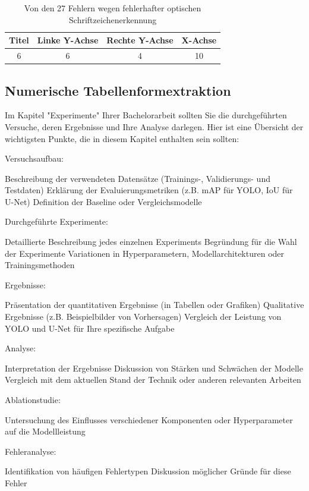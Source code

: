\begin{table}[H]
    \centering
    \begin{tabular}{|c|c|c|c|}
        \hline
        \rowcolor[HTML]{EFEFEF}
        Titel & Linke Y-Achse & Rechte Y-Achse & X-Achse \\ \hline
        6     & 6             & 4              & 10      \\ \hline
    \end{tabular}
    \caption{Von den 27 Fehlern wegen fehlerhafter optischen Schriftzeichenerkennung}
\end{table}


\subsection{Numerische Tabellenformextraktion}



Im Kapitel "Experimente" Ihrer Bachelorarbeit sollten Sie die durchgeführten Versuche, deren Ergebnisse und Ihre Analyse darlegen. Hier ist eine Übersicht der wichtigsten Punkte, die in diesem Kapitel enthalten sein sollten:

Versuchsaufbau:

Beschreibung der verwendeten Datensätze (Trainings-, Validierungs- und Testdaten)
Erklärung der Evaluierungsmetriken (z.B. mAP für YOLO, IoU für U-Net)
Definition der Baseline oder Vergleichsmodelle


Durchgeführte Experimente:

Detaillierte Beschreibung jedes einzelnen Experiments
Begründung für die Wahl der Experimente
Variationen in Hyperparametern, Modellarchitekturen oder Trainingsmethoden


Ergebnisse:

Präsentation der quantitativen Ergebnisse (in Tabellen oder Grafiken)
Qualitative Ergebnisse (z.B. Beispielbilder von Vorhersagen)
Vergleich der Leistung von YOLO und U-Net für Ihre spezifische Aufgabe


Analyse:

Interpretation der Ergebnisse
Diskussion von Stärken und Schwächen der Modelle
Vergleich mit dem aktuellen Stand der Technik oder anderen relevanten Arbeiten


Ablationstudie:

Untersuchung des Einflusses verschiedener Komponenten oder Hyperparameter auf die Modellleistung


Fehleranalyse:

Identifikation von häufigen Fehlertypen
Diskussion möglicher Gründe für diese Fehler



